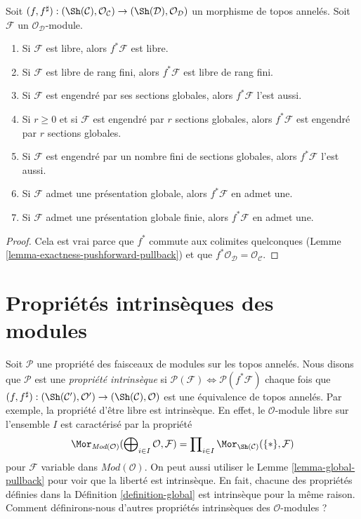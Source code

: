 \begin{lemma}
\label{lemma-global-pullback}
Soit
$(f, f^\sharp) :
(\Sh(\mathcal{C}), \mathcal{O}_\mathcal{C})
\to
(\Sh(\mathcal{D}), \mathcal{O}_\mathcal{D})$
un morphisme de topos annelés. Soit $\mathcal{F}$ un
$\mathcal{O}_\mathcal{D}$-module.
\begin{enumerate}
\item Si $\mathcal{F}$ est libre, alors $f^*\mathcal{F}$ est libre.
\item Si $\mathcal{F}$ est libre de rang fini, alors $f^*\mathcal{F}$ est
libre de rang fini.
\item Si $\mathcal{F}$ est engendré par ses sections globales, alors
$f^*\mathcal{F}$ l'est aussi.
\item Si $r \geq 0$ et si $\mathcal{F}$ est engendré par $r$ sections
globales, alors $f^*\mathcal{F}$ est engendré par $r$ sections globales.
\item Si $\mathcal{F}$ est engendré par un nombre fini de sections globales,
alors $f^*\mathcal{F}$ l'est aussi.
\item Si $\mathcal{F}$ admet une présentation globale, alors
$f^*\mathcal{F}$ en admet une.
\item Si $\mathcal{F}$ admet une présentation globale finie, alors
$f^*\mathcal{F}$ en admet une.
\end{enumerate}
\end{lemma}

\begin{proof}
Cela est vrai parce que $f^*$ commute aux colimites quelconques (Lemme
\ref{lemma-exactness-pushforward-pullback}) et que
$f^*\mathcal{O}_\mathcal{D} = \mathcal{O}_\mathcal{C}$.
\end{proof}






\section{Propriétés intrinsèques des modules}
\label{section-intrinsic}

\noindent
Soit $\mathcal{P}$ une propriété des faisceaux de modules sur les topos
annelés. Nous disons que $\mathcal{P}$ est une {\it propriété intrinsèque} si
$\mathcal{P}(\mathcal{F}) \Leftrightarrow \mathcal{P}(f^*\mathcal{F})$
chaque fois que $(f, f^\sharp) :
(\Sh(\mathcal{C}'), \mathcal{O}')
\to
(\Sh(\mathcal{C}), \mathcal{O})$
est une équivalence de topos annelés. Par exemple, la propriété d'être libre est
intrinsèque. En effet, le $\mathcal{O}$-module libre sur l'ensemble $I$ est
caractérisé par la propriété
$$
\Mor_{\textit{Mod}(\mathcal{O})}(
\bigoplus\nolimits_{i \in I} \mathcal{O},
\mathcal{F})
=
\prod\nolimits_{i \in I} \Mor_{\Sh(\mathcal{C})}(\{*\},
\mathcal{F})
$$
pour $\mathcal{F}$ variable dans $\textit{Mod}(\mathcal{O})$. On peut aussi
utiliser le Lemme \ref{lemma-global-pullback} pour voir que la liberté est
intrinsèque. En fait, chacune des propriétés définies dans la Définition
\ref{definition-global} est intrinsèque pour la même raison. Comment
définirons-nous d'autres propriétés intrinsèques des $\mathcal{O}$-modules ?

